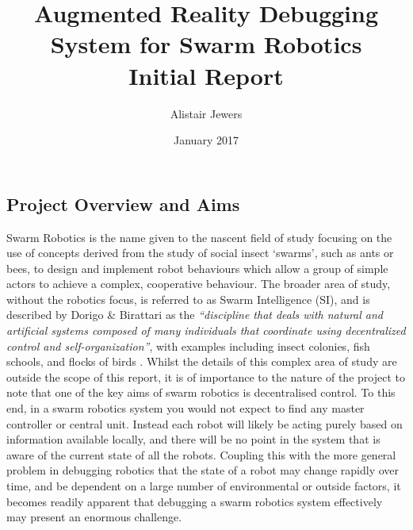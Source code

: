 \documentclass[titlepage,hidelinks,10pt]{article}
\date{January 2017}
\title{Augmented Reality Debugging System for Swarm Robotics \vspace{1cm}\\\Large{Initial Report}}
\author{Alistair Jewers}
\begin{document}
\maketitle

\tableofcontents
\newpage

\begin{multicols}{2}


\section{Project Overview and Aims}
Swarm Robotics is the name given to the nascent field of study focusing on the use of concepts derived from the study of social insect `swarms', such as ants or bees, to design and implement robot behaviours which allow a group of simple actors to achieve a complex, cooperative behaviour. The broader area of study, without the robotics focus, is referred to as Swarm Intelligence (SI), and is described by Dorigo \& Birattari as the \textit{``discipline that deals with natural and artificial systems composed of many individuals that coordinate using decentralized control and self-organization''}, with examples including insect colonies, fish schools, and flocks of birds \cite{SwarmIntelligence}. Whilst the details of this complex area of study are outside the scope of this report, it is of importance to the nature of the project to note that one of the key aims of swarm robotics is decentralised control. To this end, in a swarm robotics system you would not expect to find any master controller or central unit. Instead each robot will likely be acting purely based on information available locally, and there will be no point in the system that is aware of the current state of all the robots. Coupling this with the more general problem in debugging robotics that the state of a robot may change rapidly over time, and be dependent on a large number of environmental or outside factors, it becomes readily apparent that debugging a swarm robotics system effectively may present an enormous challenge. 


\end{multicols}
\end{document}
